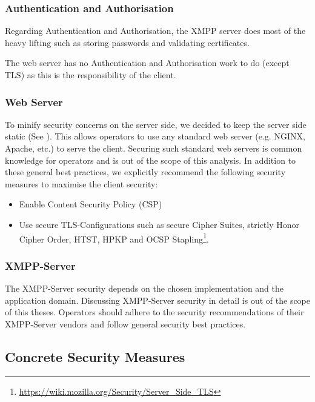\subsubsection{Authentication and Authorisation}

Regarding Authentication and Authorisation, the XMPP server does most of the heavy lifting such as storing passwords and validating certificates.

The web server has no Authentication and Authorisation work to do (except TLS) as this is the responsibility of the client.

\subsubsection{Web Server}

To minify security concerns on the server side, we decided to keep the server side static (See ).
This allows operators to use any standard web server (e.g. NGINX, Apache, etc.) to serve the client.
Securing such standard web servers is common knowledge for operators and is out of the scope of this analysis.
In addition to these general best practices, we explicitly recommend the following security measures to maximise the client security:

\begin{itemize}
    \item Enable Content Security Policy (CSP) \cite{w3c-csp}
    \item Use secure TLS-Configurations such as secure Cipher Suites, strictly Honor Cipher Order, HTST, HPKP and OCSP Stapling\footnote{\url{https://wiki.mozilla.org/Security/Server_Side_TLS}}.
\end{itemize}


\subsubsection{XMPP-Server}

The XMPP-Server security depends on the chosen implementation and the application domain.
Discussing XMPP-Server security in detail is out of the scope of this theses.
Operators should adhere to the security recommendations of their XMPP-Server vendors and follow general security best practices.

\subsection{Concrete Security Measures}


